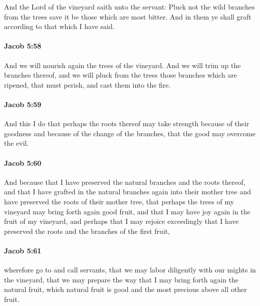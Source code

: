 			And the Lord of the vineyard saith unto the servant:
			Pluck not the wild branches from the trees save it be those which are most bitter.
			And in them ye shall graft according to that which I have said.

		\paragraph{Jacob 5:58} %
			\label{JACOB-5-58}

			And we will nourish again the trees of the vineyard.
			And we will trim up the branches thereof,
			and we will pluck from the trees those branches
			which are ripened, that must perish,
			and cast them into the fire.

		\paragraph{Jacob 5:59} %
			\label{JACOB-5-59}

			And this I do that perhaps the roots thereof may take strength
			because of their goodness and because of the change of the branches,
			that the good may overcome the evil.

		\paragraph{Jacob 5:60} %
			\label{JACOB-5-60}

			And because that I have preserved the natural branches and the roots thereof,
			and that I have grafted in the natural branches again into their mother tree
			and have preserved the roots of their mother tree,
			that perhaps the trees of my vineyard may bring forth again good fruit,
			and that I may have joy again in the fruit of my vineyard,
			and perhaps that I may rejoice exceedingly
			that I have preserved the roots and the branches of the first fruit,

		\paragraph{Jacob 5:61} %
			\label{JACOB-5-61}

			wherefore go to and call servants,
			that we may labor diligently with our mights in the vineyard,
			that we may prepare the way that I may bring forth again the natural fruit,
			which natural fruit is good and the most precious above all other fruit.

